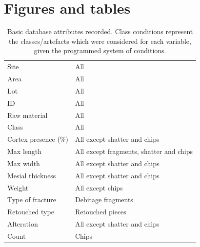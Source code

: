 \documentclass[12pt,twoside]{reedthesis}
\begin{document}
\appendix

\hypertarget{figures-and-tables}{%
\chapter{Figures and tables}\label{figures-and-tables}}
\begin{table}

\caption{\label{tab:basicdb}Basic database attributes recorded. Class conditions represent the classes/artefacts which were considered for each variable, given the programmed system of conditions.}
\centering
\fontsize{9}{11}\selectfont
\begin{tabular}[t]{>{\raggedright\arraybackslash}p{5cm}>{\raggedright\arraybackslash}p{5cm}}
\toprule
\multicolumn{1}{>{\centering\arraybackslash}p{5cm}}{\textbf{Recorded variables}} & \multicolumn{1}{>{\centering\arraybackslash}p{5cm}}{\textbf{Class conditions}}\\
\midrule
Site & All\\
Area & All\\
Lot & All\\
ID & All\\
Raw material & All\\
\addlinespace
Class & All\\
Cortex presence (\%) & All except shatter and chips\\
Max length & All except fragments, shatter and chips\\
Max width & All except shatter and chips\\
Mesial thickness & All except shatter and chips\\
\addlinespace
Weight & All except chips\\
Type of fracture & Debitage fragments\\
Retouched type & Retouched pieces\\
Alteration & All except shatter and chips\\
Count & Chips\\
\bottomrule
\end{tabular}
\end{table}
\begingroup\fontsize{9}{11}\selectfont
\end{document}
